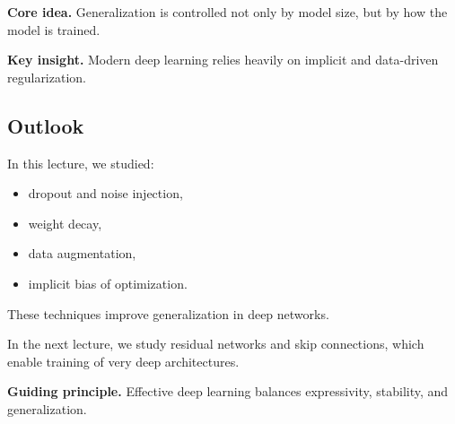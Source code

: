 \medskip

\noindent
\textbf{Core idea.}  
Generalization is controlled not only by model size, but by how the model is trained.

\medskip

\noindent
\textbf{Key insight.}  
Modern deep learning relies heavily on implicit and data-driven regularization.

\subsection{Outlook}

In this lecture, we studied:

\begin{itemize}
    \item dropout and noise injection,
    \item weight decay,
    \item data augmentation,
    \item implicit bias of optimization.
\end{itemize}

\medskip

\noindent
These techniques improve generalization in deep networks.

\medskip

\noindent
In the next lecture, we study residual networks and skip connections, which enable training of very deep architectures.

\medskip

\noindent
\textbf{Guiding principle.}  
Effective deep learning balances expressivity, stability, and generalization.